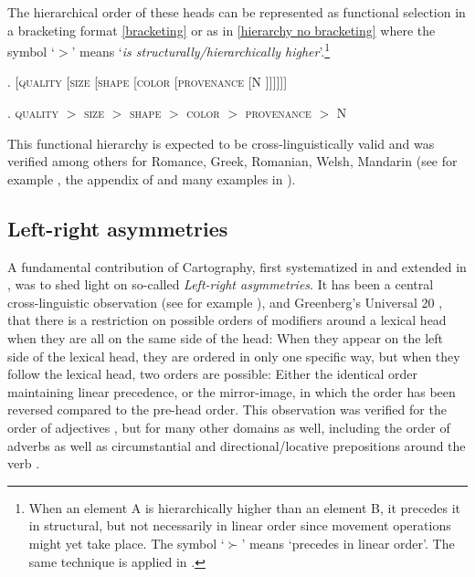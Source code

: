 \documentclass [output=book,colorlinks,citecolor=brown]{langscibook}
\begin{document}
The hierarchical order of these heads can be represented as functional selection in a bracketing format \ref{bracketing} or as in \ref{hierarchy no bracketing} where the symbol `$>$' means `\textit{is structurally/hierarchically higher}’.\footnote{When an element A is hierarchically higher than an element B, it precedes it in structural, but not necessarily in linear order since movement operations might yet take place. The symbol `$\succ$’ means `precedes in linear order’. The same technique is applied in \citet{panayidou:2013:in}.}

\ex. [\textsc{quality} [\textsc{size} [\textsc{shape} [\textsc{color} [\textsc{provenance} [N ]]]]]] \label{bracketing}

\ex. \textsc{quality} $>$ \textsc{size} $>$ \textsc{shape} $>$ \textsc{color} $>$ \textsc{provenance} $>$ N \label{hierarchy no bracketing}

This functional hierarchy is expected to be cross-linguistically valid and was verified among others for Romance, Greek, Romanian, Welsh, Mandarin (see for example \citealt{scott:2002:stacked}, the appendix of \citealt{cinque:2010:adj} and many examples in \citealt{alex:2007:nounphrase}).

\subsection{Left-right asymmetries} \label{left-right}

A fundamental contribution of Cartography, first systematized in \citet{cinque:2005:deriving, cinque:2009:fundamental} and extended in \citet{cinque:2023:linearization, cinque:2025:superiority}, was to shed light on so-called \textit{Left-right asymmetries}. It has been a central cross-linguistic observation (see for example \citealt{rijkhoff:2002:noun}), and Greenberg's Universal 20 \citep{greenberg:1963:some}, that there is a restriction on possible orders of modifiers around a lexical head when they are all on the same side of the head: When they appear on the left side of the lexical head, they are ordered in only one specific way, but when they follow the lexical head, two orders are possible: Either the identical order maintaining linear precedence, or the mirror-image, in which the order has been reversed compared to the pre-head order. This observation was verified for the order of adjectives \citep{cinque:2009:fundamental, shlonsky:2004:form}, but for many other domains as well, including the order of adverbs as well as circumstantial and directional/locative prepositions around the verb \citep[167–168]{cinque:2009:fundamental}. %
\end{document}

